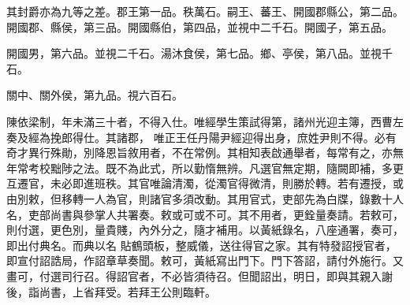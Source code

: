 \begin{pinyinscope}
 其封爵亦為九等之差。郡王第一品。秩萬石。嗣王、蕃王、開國郡縣公，第二品。開國郡、縣侯，第三品。開國縣伯，第四品，並視中二千石。開國子，第五品。



 開國男，第六品。並視二千石。湯沐食侯，第七品。鄉、亭侯，第八品。並視千石。



 關中、關外侯，第九品。視六百石。



 陳依梁制，年未滿三十者，不得入仕。唯經學生策試得第，諸州光迎主簿，西曹左奏及經為挽郎得仕。其諸郡，
 唯正王任丹陽尹經迎得出身，庶姓尹則不得。必有奇才異行殊勛，別降恩旨敘用者，不在常例。其相知表啟通舉者，每常有之，亦無年常考校黜陟之法。既不為此式，所以勤惰無辨。凡選官無定期，隨闕即補，多更互遷官，未必即進班秩。其官唯論清濁，從濁官得微清，則勝於轉。若有遷授，或由別敕，但移轉一人為官，則諸官多須改動。其用官式，吏部先為白牒，錄數十人名，吏部尚書與參掌人共署奏。敕或可或不可。其不用者，更銓量奏請。若敕可，則付選，更色別，量貴賤，內外分之，隨才補用。以黃紙錄名，八座通署，奏可，即出付典名。而典以名
 貼鶴頭板，整威儀，送往得官之家。其有特發詔授官者，即宣付詔誥局，作詔章草奏聞。敕可，黃紙寫出門下。門下答詔，請付外施行。又畫可，付選司行召。得詔官者，不必皆須待召。但聞詔出，明日，即與其親入謝後，詣尚書，上省拜受。若拜王公則臨軒。



\end{pinyinscope}